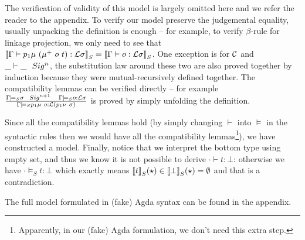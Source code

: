 The verification of validity of this model is largely omitted here and we refer the reader to the appendix. To verify our model preserve the judgemental equality, usually unpacking the definition is enough -- for example, to verify $\beta$-rule for linkage projection, we only need to see that ${{\llbracket {{ {\Gamma} \vdash {p_1\mu~(\mu^+~o~t)} : {{\mathcal{L}}\sigma} }} \rrbracket}_S} = {{\llbracket {{ {\Gamma} \vdash {o} : {{\mathcal{L}}\sigma} }} \rrbracket}_S}$. One exception is for ${\mathcal{C}}$ and ${ {\_} \vdash {\_} \ \ Sig^{n} }$, the substitution law around these two are also proved together by induction because they were mutual-recursively defined together. The compatibility lemmas can be verified directly -- for example $\frac{{ {\Gamma} \models_S {\sigma} \ \ Sig^{n+1} }\quad{ {\Gamma} \models_S {o} : {{\mathcal{L}}\sigma} }}{{ {\Gamma} \models_S {p_1\mu~o} : {{\mathcal{L}}(p_1\nu~\sigma)} }}$ is proved by simply unfolding the definition.


Since all the compatibility lemmas hold (by simply changing $\vdash$ into $\models$ in the syntactic rules then we would have all the compatibility lemmas\footnote{Apparently, in our (fake) Agda formulation, we don't need this extra step.}), we have constructed a model.
Finally, notice that we interpret the bottom type using empty set, and thus we know it is not possible to derive $\cdot \vdash t : \bot$: otherwise we have $\cdot \models_S t : \bot$ which exactly means ${{\llbracket {t} \rrbracket}_S}(\star) \in {{\llbracket {\bot} \rrbracket}_S}(\star) = \emptyset$ 
and that is a contradiction.

The full model formulated in (fake) Agda syntax can be found in the appendix.

